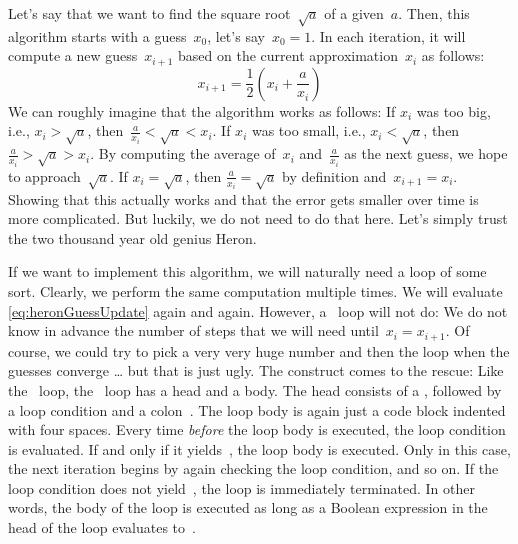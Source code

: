 Let's say that we want to find the square root~$\sqrt{a}$ of a given~$a$.
Then, this algorithm starts with a guess~$x_0$, let's say~$x_0=1$.
In each iteration, it will compute a new guess~$x_{i+1}$ based on the current approximation~$x_i$ as follows:%
%
\begin{equation}%
x_{i+1}=\frac{1}{2}\left(x_i+\frac{a}{x_i}\right)%
\label{eq:heronGuessUpdate}%
\end{equation}%
%
We can roughly imagine that the algorithm works as follows:
If $x_i$ was too big, i.e., $x_i>\sqrt{a}$, then~$\frac{a}{x_i}<\sqrt{a}<x_i$.
If $x_i$ was too small, i.e., $x_i<\sqrt{a}$, then $\frac{a}{x_i}>\sqrt{a}>x_i$.
By computing the average of~$x_i$ and~$\frac{a}{x_i}$ as the next guess, we hope to approach~$\sqrt{a}$.
If $x_i=\sqrt{a}$, then $\frac{a}{x_i}=\sqrt{a}$ by definition and~$x_{i+1}=x_i$.
Showing that this actually works and that the error gets smaller over time is more complicated.
But luckily, we do not need to do that here.
Let's simply trust the two thousand year old genius Heron.

If we want to implement this algorithm, we will naturally need a loop of some sort.
Clearly, we perform the same computation multiple times.
We will evaluate \cref{eq:heronGuessUpdate} again and again.
However, a ~loop will not do:
We do not know in advance the number of steps that we will need until~$x_i = x_{i+1}$.
Of course, we could try to pick a very very huge number and then  the loop when the guesses converge {\dots} but that is just ugly.
The  construct comes to the rescue\cite{PSF:P3D:TPT:MCFT}:%
%
%
\FloatBarrier%
%
%
%
%
Like the ~loop, the ~loop has a head and a body.
The head consists of a , followed by a loop condition  and a colon~\pythonil{:}.
The loop body is again just a code block indented with four spaces.
Every time \emph{before} the loop body is executed, the loop condition  is evaluated.
If and only if it yields~, the loop body is executed.
Only in this case, the next iteration begins by again checking the loop condition, and so on.
If the loop condition does not yield~, the loop is immediately terminated.
In other words, the body of the loop is executed as long as a Boolean expression in the head of the loop evaluates to~.

